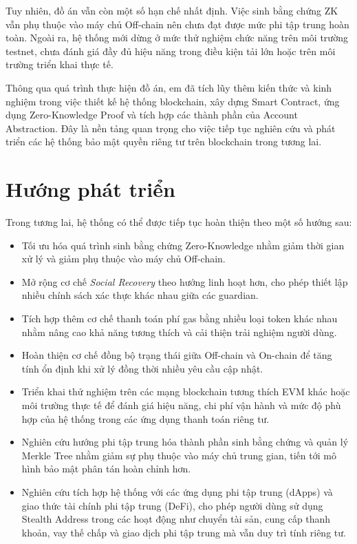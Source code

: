 \documentclass[../DoAn.tex]{subfiles}
\begin{document}
Tuy nhiên, đồ án vẫn còn một số hạn chế nhất định. Việc sinh bằng chứng ZK vẫn phụ thuộc vào máy chủ Off-chain nên chưa đạt được mức phi tập trung hoàn toàn. Ngoài ra, hệ thống mới dừng ở mức thử nghiệm chức năng trên môi trường testnet, chưa đánh giá đầy đủ hiệu năng trong điều kiện tải lớn hoặc trên môi trường triển khai thực tế.

Thông qua quá trình thực hiện đồ án, em đã tích lũy thêm kiến thức và kinh nghiệm trong việc thiết kế hệ thống blockchain, xây dựng Smart Contract, ứng dụng Zero-Knowledge Proof và tích hợp các thành phần của Account Abstraction. Đây là nền tảng quan trọng cho việc tiếp tục nghiên cứu và phát triển các hệ thống bảo mật quyền riêng tư trên blockchain trong tương lai.

\section{Hướng phát triển}

Trong tương lai, hệ thống có thể được tiếp tục hoàn thiện theo một số hướng sau:

\begin{itemize}
    \item Tối ưu hóa quá trình sinh bằng chứng Zero-Knowledge nhằm giảm thời gian xử lý và giảm phụ thuộc vào máy chủ Off-chain.
    
    \item Mở rộng cơ chế \textit{Social Recovery} theo hướng linh hoạt hơn, cho phép thiết lập nhiều chính sách xác thực khác nhau giữa các guardian.
    
    \item Tích hợp thêm cơ chế thanh toán phí gas bằng nhiều loại token khác nhau nhằm nâng cao khả năng tương thích và cải thiện trải nghiệm người dùng.
    
    \item Hoàn thiện cơ chế đồng bộ trạng thái giữa Off-chain và On-chain để tăng tính ổn định khi xử lý đồng thời nhiều yêu cầu cập nhật.
    
    \item Triển khai thử nghiệm trên các mạng blockchain tương thích EVM khác hoặc môi trường thực tế để đánh giá hiệu năng, chi phí vận hành và mức độ phù hợp của hệ thống trong các ứng dụng thanh toán riêng tư.
    
    \item Nghiên cứu hướng phi tập trung hóa thành phần sinh bằng chứng và quản lý Merkle Tree nhằm giảm sự phụ thuộc vào máy chủ trung gian, tiến tới mô hình bảo mật phân tán hoàn chỉnh hơn.
    \item Nghiên cứu tích hợp hệ thống với các ứng dụng phi tập trung (dApps) và giao thức tài chính phi tập trung (DeFi), cho phép người dùng sử dụng Stealth Address trong các hoạt động như chuyển tài sản, cung cấp thanh khoản, vay thế chấp và giao dịch phi tập trung mà vẫn duy trì tính riêng tư.
\end{itemize}
\end{document}
